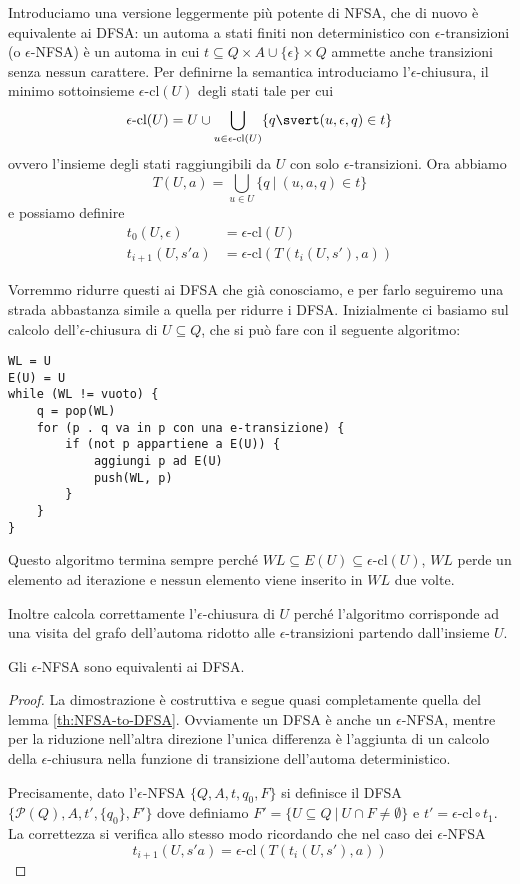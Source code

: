 \documentclass[12pt]{article}
\numberwithin{theorem}{subsection}
\begin{document}
Introduciamo una versione leggermente più potente di NFSA, che di nuovo è equivalente ai DFSA: un automa a stati finiti non deterministico con $\epsilon$-transizioni (o $\epsilon$-NFSA) è un automa in cui $t \subseteq Q \times A \cup \{ \epsilon \} \times Q$ ammette anche transizioni senza nessun carattere. Per definirne la semantica introduciamo l'$\epsilon$-chiusura, il minimo sottoinsieme $\epsilon$-cl$(U)$ degli stati tale per cui
\[
\epsilon\text{-cl}(U) = U \cup \bigcup\limits_{u \in \epsilon\text{-cl}(U)} \{ q \svert (u, \epsilon, q) \in t \}
\]
ovvero l'insieme degli stati raggiungibili da $U$ con solo $\epsilon$-transizioni. Ora abbiamo
\[
T(U, a) = \bigcup\limits_{u \in U} \{ q \ \vert \ (u, a, q) \in t \}
\]
e possiamo definire
\begin{align*}
t_0(U, \epsilon) &= \epsilon\text{-cl}(U) \\
t_{i+1}(U, s'a) &= \epsilon\text{-cl}\left(T(t_i(U, s'), a)\right)
\end{align*}

Vorremmo ridurre questi ai DFSA che già conosciamo, e per farlo seguiremo una strada abbastanza simile a quella per ridurre i DFSA. Inizialmente ci basiamo sul calcolo dell'$\epsilon$-chiusura di $U \subseteq Q$, che si può fare con il seguente algoritmo:
\begin{verbatim}
WL = U
E(U) = U
while (WL != vuoto) {
	q = pop(WL)
	for (p . q va in p con una e-transizione) {
		if (not p appartiene a E(U)) {
			aggiungi p ad E(U)
			push(WL, p)
		}
	}
}
\end{verbatim}

\begin{remark}
	Questo algoritmo termina sempre perché $WL \subseteq E(U) \subseteq \epsilon\text{-cl}(U)$, $WL$ perde un elemento ad iterazione e nessun elemento viene inserito in $WL$ due volte.
	
	Inoltre calcola correttamente l'$\epsilon$-chiusura di $U$ perché l'algoritmo corrisponde ad una visita del grafo dell'automa ridotto alle $\epsilon$-transizioni partendo dall'insieme $U$.
\end{remark}

\begin{lemma}\label{th:epsilon-nfsa-reduction}
	Gli $\epsilon$-NFSA sono equivalenti ai DFSA.
\end{lemma}
\begin{proof}
	La dimostrazione è costruttiva e segue quasi completamente quella del lemma \ref{th:NFSA-to-DFSA}. Ovviamente un DFSA è anche un $\epsilon$-NFSA, mentre per la riduzione nell'altra direzione l'unica differenza è l'aggiunta di un calcolo della $\epsilon$-chiusura nella funzione di transizione dell'automa deterministico.
	
	Precisamente, dato l'$\epsilon$-NFSA $\{ Q, A, t, q_0, F \}$ si definisce il DFSA $\{ \mathcal{P}(Q), A, t', \{ q_0 \}, F' \}$ dove definiamo $F' = \{ U \subseteq Q \ \vert \ U \cap F \neq \emptyset \}$ e $t' = \epsilon\text{-cl} \circ t_1$. La correttezza si verifica allo stesso modo ricordando che nel caso dei $\epsilon$-NFSA
	\[
	t_{i+1}(U, s'a) = \epsilon\text{-cl}\left(T(t_i(U, s'), a)\right)
	\]
\end{proof}
\end{document}
